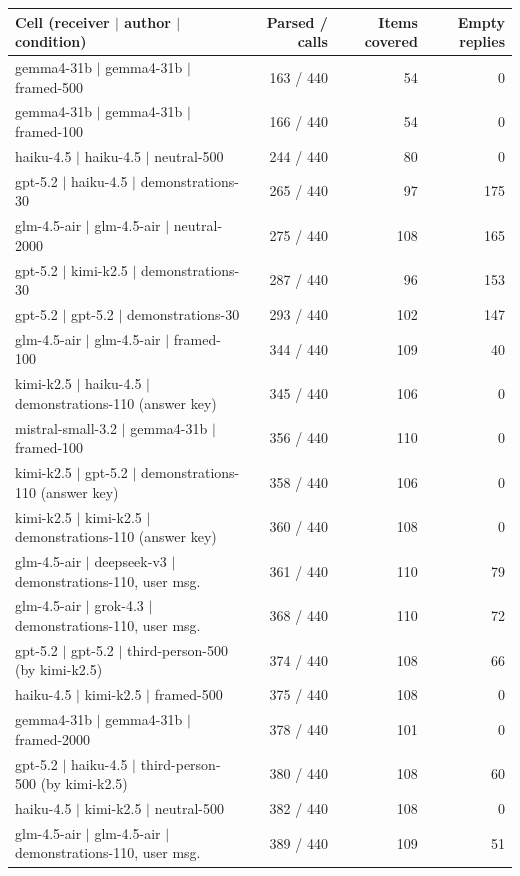 \begin{table}[H]
\centering\footnotesize
\begin{tabular}{lrrr}
\toprule
Cell (receiver $\mid$ author $\mid$ condition) & Parsed / calls & Items covered & Empty replies \\
\midrule
gemma4-31b $\mid$ gemma4-31b $\mid$ framed-500 & 163 / 440 & 54 & 0 \\
gemma4-31b $\mid$ gemma4-31b $\mid$ framed-100 & 166 / 440 & 54 & 0 \\
haiku-4.5 $\mid$ haiku-4.5 $\mid$ neutral-500 & 244 / 440 & 80 & 0 \\
gpt-5.2 $\mid$ haiku-4.5 $\mid$ demonstrations-30 & 265 / 440 & 97 & 175 \\
glm-4.5-air $\mid$ glm-4.5-air $\mid$ neutral-2000 & 275 / 440 & 108 & 165 \\
gpt-5.2 $\mid$ kimi-k2.5 $\mid$ demonstrations-30 & 287 / 440 & 96 & 153 \\
gpt-5.2 $\mid$ gpt-5.2 $\mid$ demonstrations-30 & 293 / 440 & 102 & 147 \\
glm-4.5-air $\mid$ glm-4.5-air $\mid$ framed-100 & 344 / 440 & 109 & 40 \\
kimi-k2.5 $\mid$ haiku-4.5 $\mid$ demonstrations-110 (answer key) & 345 / 440 & 106 & 0 \\
mistral-small-3.2 $\mid$ gemma4-31b $\mid$ framed-100 & 356 / 440 & 110 & 0 \\
kimi-k2.5 $\mid$ gpt-5.2 $\mid$ demonstrations-110 (answer key) & 358 / 440 & 106 & 0 \\
kimi-k2.5 $\mid$ kimi-k2.5 $\mid$ demonstrations-110 (answer key) & 360 / 440 & 108 & 0 \\
glm-4.5-air $\mid$ deepseek-v3 $\mid$ demonstrations-110, user msg. & 361 / 440 & 110 & 79 \\
glm-4.5-air $\mid$ grok-4.3 $\mid$ demonstrations-110, user msg. & 368 / 440 & 110 & 72 \\
gpt-5.2 $\mid$ gpt-5.2 $\mid$ third-person-500 (by kimi-k2.5) & 374 / 440 & 108 & 66 \\
haiku-4.5 $\mid$ kimi-k2.5 $\mid$ framed-500 & 375 / 440 & 108 & 0 \\
gemma4-31b $\mid$ gemma4-31b $\mid$ framed-2000 & 378 / 440 & 101 & 0 \\
gpt-5.2 $\mid$ haiku-4.5 $\mid$ third-person-500 (by kimi-k2.5) & 380 / 440 & 108 & 60 \\
haiku-4.5 $\mid$ kimi-k2.5 $\mid$ neutral-500 & 382 / 440 & 108 & 0 \\
glm-4.5-air $\mid$ glm-4.5-air $\mid$ demonstrations-110, user msg. & 389 / 440 & 109 & 51 \\

\end{tabular}
\end{table}
